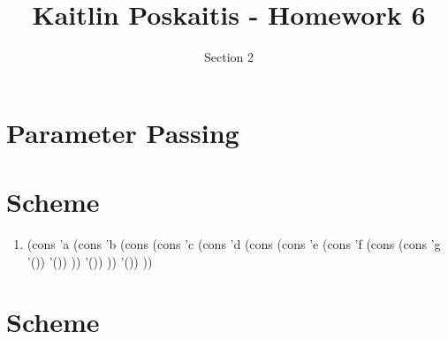 \documentclass[11pt]{article}
\title{\bf Kaitlin Poskaitis - Homework 6}
\author{Section 2}
\date{}
\begin{document}
\maketitle

\section{Parameter Passing}

\section{Scheme}

\begin{enumerate}
	\item 
	(cons 'a (cons 'b 
		(cons (cons 'c (cons 'd 
			(cons (cons 'e (cons 'f 
				(cons (cons 'g '()) '())
			)) '())
		)) '()) 
	))
\end{enumerate}

\section{Scheme}
\end{document}
